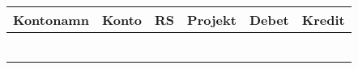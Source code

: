 \documentclass[a4paper,10pt]{article}
\begin{document}
\begin{center}
  \begin{tabular}{|p{4.5cm}|p{.8cm}|p{.4cm}|p{1.0cm}|p{1.6cm}|p{1.6cm}|}
    \hline
        \vspace{0pt}\large{Kontonamn} &\vspace{0pt}\small{Konto}& \vspace{0pt}\small{RS} & \vspace{0pt}\small{Projekt} & \vspace{0pt}\large{Debet} & \vspace{0pt}\large{Kredit} \\
    \hline
    \hline

{\raisebox{-5pt}{\normalsize{\kontonamnA{}}}}
&\centering {\raisebox{-6pt}{\large{\KontoA{}}}} 
&\centering {\raisebox{-6pt}{\large{\RSA{}}}}
&\centering {\raisebox{-6pt}{\large{\ProjektA{}}}}
&\hfill     {\raisebox{-6pt}{\large{\DebetA{}}}} 
&\hfill     {\raisebox{-6pt}{\large{\KreditA{}}}} 
		\vspace{6pt}
		\\
    \hline
{\raisebox{-5pt}{\normalsize{\kontonamnB{}}}}
&\centering {\raisebox{-6pt}{\large{\KontoB{}}}} 
&\centering {\raisebox{-6pt}{\large{\RSB{}}}}
&\centering {\raisebox{-6pt}{\large{\ProjektB{}}}}
&\hfill     {\raisebox{-6pt}{\large{\DebetB{}}}} 
&\hfill     {\raisebox{-6pt}{\large{\KreditB{}}}} 
		\vspace{6pt}
		\\
    \hline
{\raisebox{-5pt}{\normalsize{\kontonamnC{}}}}
&\centering {\raisebox{-6pt}{\large{\KontoC{}}}} 
&\centering {\raisebox{-6pt}{\large{\RSC{}}}}
&\centering {\raisebox{-6pt}{\large{\ProjektC{}}}}
&\hfill     {\raisebox{-6pt}{\large{\DebetC{}}}} 
&\hfill     {\raisebox{-6pt}{\large{\KreditC{}}}} 
		\vspace{6pt}
		\\
    \hline
{\raisebox{-5pt}{\normalsize{\kontonamnD{}}}}
&\centering {\raisebox{-6pt}{\large{\KontoD{}}}} 
&\centering {\raisebox{-6pt}{\large{\RSD{}}}}
&\centering {\raisebox{-6pt}{\large{\ProjektD{}}}}
&\hfill     {\raisebox{-6pt}{\large{\DebetD{}}}} 
&\hfill     {\raisebox{-6pt}{\large{\KreditD{}}}} 
		\vspace{6pt}
		\\
    \hline
{\raisebox{-5pt}{\normalsize{\kontonamnE{}}}}
&\centering {\raisebox{-6pt}{\large{\KontoE{}}}} 
&\centering {\raisebox{-6pt}{\large{\RSE{}}}}
&\centering {\raisebox{-6pt}{\large{\ProjektE{}}}}
&\hfill     {\raisebox{-6pt}{\large{\DebetE{}}}} 
&\hfill     {\raisebox{-6pt}{\large{\KreditE{}}}} 
		\vspace{6pt}
		\\
    \hline
        \multicolumn{4}{|r|}{\raisebox{-5pt}{TOTALT}} &\hfill{\raisebox{-6pt}{\large{\TotalDebet{}}}}
							\vspace{.6\baselineskip} &\hfill{\raisebox{-6pt}{\large{\TotalKredit{}}}} \\
    \hline  
  \end{tabular}
\end{center}
\end{document}
